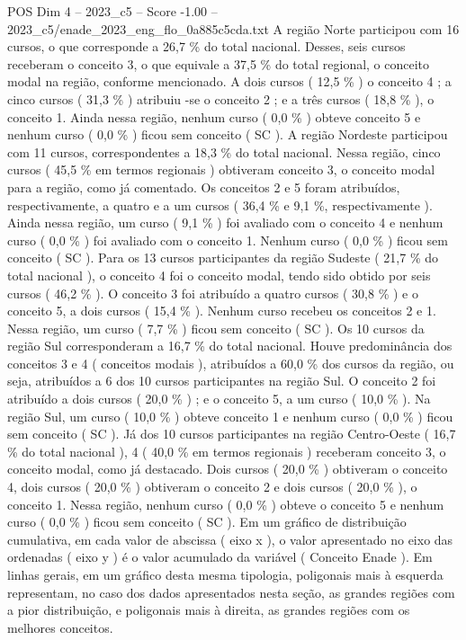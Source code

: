 \begin{textsample}{POS Dim 4 – 2023\_c5 – Score -1.00 – 2023\_c5/enade\_2023\_eng\_flo\_0a885c5cda.txt}
A região Norte participou com 16 cursos, o que corresponde a 26,7 \% do total nacional.
Desses, seis cursos receberam o conceito 3, o que equivale a 37,5 \% do total regional, o conceito modal na região, conforme mencionado.
A dois cursos ( 12,5 \% ) o conceito 4 ; a cinco cursos ( 31,3 \% ) atribuiu -se o conceito 2 ; e a três cursos ( 18,8 \% ), o conceito 1.
Ainda nessa região, nenhum curso ( 0,0 \% ) obteve conceito 5 e nenhum curso ( 0,0 \% ) ficou sem conceito ( SC ).
A região Nordeste participou com 11 cursos, correspondentes a 18,3 \% do total nacional.
Nessa região, cinco cursos ( 45,5 \% em termos regionais ) obtiveram conceito 3, o conceito modal para a região, como já comentado.
Os conceitos 2 e 5 foram atribuídos, respectivamente, a quatro e a um cursos ( 36,4 \% e 9,1 \%, respectivamente ).
Ainda nessa região, um curso ( 9,1 \% ) foi avaliado com o conceito 4 e nenhum curso ( 0,0 \% ) foi avaliado com o conceito 1.
Nenhum curso ( 0,0 \% ) ficou sem conceito ( SC ).
Para os 13 cursos participantes da região Sudeste ( 21,7 \% do total nacional ), o conceito 4 foi o conceito modal, tendo sido obtido por seis cursos ( 46,2 \% ).
O conceito 3 foi atribuído a quatro cursos ( 30,8 \% ) e o conceito 5, a dois cursos ( 15,4 \% ).
Nenhum curso recebeu os conceitos 2 e 1.
Nessa região, um curso ( 7,7 \% ) ficou sem conceito ( SC ).
Os 10 cursos da região Sul corresponderam a 16,7 \% do total nacional.
Houve predominância dos conceitos 3 e 4 ( conceitos modais ), atribuídos a 60,0 \% dos cursos da região, ou seja, atribuídos a 6 dos 10 cursos participantes na região Sul.
O conceito 2 foi atribuído a dois cursos ( 20,0 \% ) ; e o conceito 5, a um curso ( 10,0 \% ).
Na região Sul, um curso ( 10,0 \% ) obteve conceito 1 e nenhum curso ( 0,0 \% ) ficou sem conceito ( SC ).
Já dos 10 cursos participantes na região Centro-Oeste ( 16,7 \% do total nacional ), 4 ( 40,0 \% em termos regionais ) receberam conceito 3, o conceito modal, como já destacado.
Dois cursos ( 20,0 \% ) obtiveram o conceito 4, dois cursos ( 20,0 \% ) obtiveram o conceito 2 e dois cursos ( 20,0 \% ), o conceito 1.
Nessa região, nenhum curso ( 0,0 \% ) obteve o conceito 5 e nenhum curso ( 0,0 \% ) ficou sem conceito ( SC ).
Em um gráfico de distribuição cumulativa, em cada valor de abscissa ( eixo x ), o valor apresentado no eixo das ordenadas ( eixo y ) é o valor acumulado da variável ( Conceito Enade ).
Em linhas gerais, em um gráfico desta mesma tipologia, poligonais mais à esquerda representam, no caso dos dados apresentados nesta seção, as grandes regiões com a pior distribuição, e poligonais mais à direita, as grandes regiões com os melhores conceitos.

\end{textsample}
